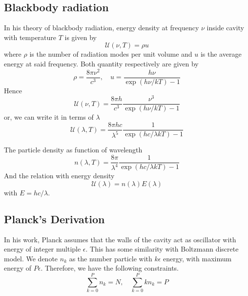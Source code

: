 \documentclass[../../../Main.tex]{subfiles}
\begin{document}
\subsection{Blackbody radiation}
In his theory of blackbody radiation, energy density at frequency $\nu$ inside cavity with temperature $T$ is given by
\begin{equation*}
    \mathcal{U}(\nu,T)=\rho u
\end{equation*}
where $\rho$ is the number of radiation modes per unit volume and $u$ is the average energy at said frequency. Both quantity respectively are given by 
\begin{equation*}
    \rho=\frac{8\pi\nu^2}{c^3},\quad u=\frac{h\nu}{\exp(h\nu/k T)-1}
\end{equation*}
Hence
\begin{equation*}
    \mathcal{U}(\nu,T)=\frac{8\pi h}{c^3}\frac{\nu^3}{\exp(h\nu/k T)-1}
\end{equation*}
or, we can write it in terms of $\lambda$
\begin{equation*}
    \mathcal{U}(\lambda,T)=\frac{8\pi hc}{\lambda^5}\frac{1}{\exp(hc/\lambda k T)-1}
\end{equation*}

The particle density as function of wavelength
\begin{equation*}
    n(\lambda,T)=\frac{8\pi}{\lambda^4}\frac{1}{\exp(hc/\lambda k T)-1}
\end{equation*} 
And the relation with energy density
\begin{equation*}
    \mathcal{U}(\lambda)=n(\lambda)E(\lambda)
\end{equation*}
with $E=hc/\lambda$. 

\subsection{Planck's Derivation}

In his work, Planck assumes that the walls of the cavity act as oscillator with  energy of integer multiple $\epsilon$. This has some similarity with Boltzmann discrete model. We denote $n_k$ as the number particle with $k\epsilon$ energy, with maximum energy of $P\epsilon$. Therefore, we have the following constraints.
\begin{equation*}
    \sum_{k=0}^{P}n_k=N,\quad\sum_{k=0}^{P}kn_k=P
\end{equation*}
\end{document}
